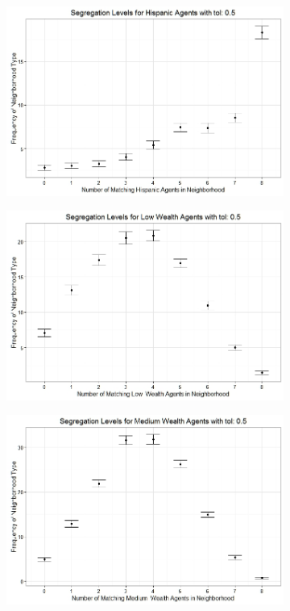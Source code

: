\begin{figure}[h!]
\begin{subfigure}{.5\textwidth}
\includegraphics[scale=.35]{figures/2010_5_Hispanic.jpeg}
\end{subfigure}%
\begin{subfigure}{.5\textwidth}
  \centering
\includegraphics[scale=.35]{figures/2010_5_Low.jpeg}
\end{subfigure}
\hfill \break \hfill \break
\begin{subfigure}{.5\textwidth}
  \centering
\includegraphics[scale=.35]{figures/2010_5_Med.jpeg}

\end{subfigure}
\end{figure}
